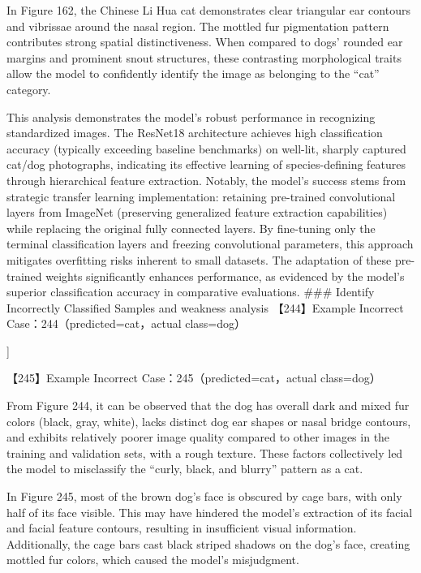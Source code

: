 In Figure 162, the Chinese Li Hua cat demonstrates clear triangular ear
contours and vibrissae around the nasal region. The mottled fur
pigmentation pattern contributes strong spatial distinctiveness. When
compared to dogs' rounded ear margins and prominent snout structures,
these contrasting morphological traits allow the model to confidently
identify the image as belonging to the ``cat'' category.

This analysis demonstrates the model's robust performance in recognizing
standardized images. The ResNet18 architecture achieves high
classification accuracy (typically exceeding baseline benchmarks) on
well-lit, sharply captured cat/dog photographs, indicating its effective
learning of species-defining features through hierarchical feature
extraction. Notably, the model's success stems from strategic transfer
learning implementation: retaining pre-trained convolutional layers from
ImageNet (preserving generalized feature extraction capabilities) while
replacing the original fully connected layers. By fine-tuning only the
terminal classification layers and freezing convolutional parameters,
this approach mitigates overfitting risks inherent to small datasets.
The adaptation of these pre-trained weights significantly enhances
performance, as evidenced by the model's superior classification
accuracy in comparative evaluations. \#\#\# Identify Incorrectly
Classified Samples and weakness analysis 【244】Example Incorrect
Case：244（predicted=cat，actual class=dog）

{]}

【245】Example Incorrect Case：245（predicted=cat，actual class=dog）

From Figure 244, it can be observed that the dog has overall dark and
mixed fur colors (black, gray, white), lacks distinct dog ear shapes or
nasal bridge contours, and exhibits relatively poorer image quality
compared to other images in the training and validation sets, with a
rough texture. These factors collectively led the model to misclassify
the ``curly, black, and blurry'' pattern as a cat.

In Figure 245, most of the brown dog's face is obscured by cage bars,
with only half of its face visible. This may have hindered the model's
extraction of its facial and facial feature contours, resulting in
insufficient visual information. Additionally, the cage bars cast black
striped shadows on the dog's face, creating mottled fur colors, which
caused the model's misjudgment.

